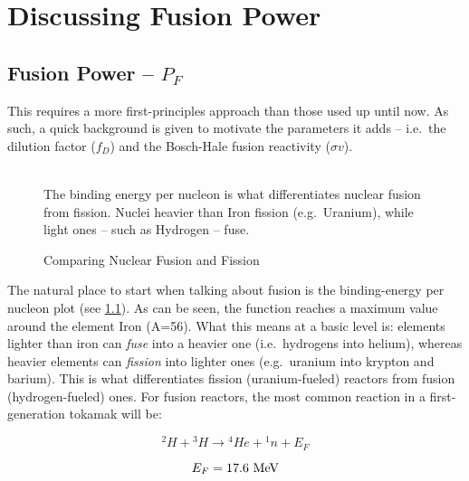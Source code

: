 \chapter{Discussing Fusion Power}

\label{chapter:power}

\section{Fusion Power -- $P_F$}

This requires a more first-principles approach than those used up until now. As such, a quick background is given to motivate the parameters it adds -- i.e.\ the dilution factor ($f_{D}$) and the Bosch-Hale fusion reactivity ($\sigma v$).

\begin{figure}
	\centering
	\begin{adjustbox}{width=0.75\textwidth}
		
	\end{adjustbox}
	\caption{Comparing Nuclear Fusion and Fission} ~\\
	\small The binding energy per nucleon is what differentiates nuclear fusion from fission. Nuclei heavier than Iron fission (e.g.\ Uranium), while light ones -- such as Hydrogen -- fuse. 
	\label{fig:binding_energy}
\end{figure}

The natural place to start when talking about fusion is the binding-energy per nucleon plot (see \cref{fig:binding_energy}). As can be seen, the function reaches a maximum value around the element Iron (A=56). What this means at a basic level is: elements lighter than iron can \emph{fuse} into a heavier one (i.e.\ hydrogens into helium), whereas heavier elements can \emph{fission} into lighter ones (e.g.\ uranium into krypton and barium). This is what differentiates fission (uranium-fueled) reactors from fusion (hydrogen-fueled) ones. For fusion reactors, the most common reaction in a first-generation tokamak will be:

\begin{equation}
	{}^2H+ {}^3H \rightarrow {}^4 He + {}^1 n + E_F
\end{equation}

\begin{equation}
	E_F = 17.6 \ \textnormal{MeV}
\end{equation}

